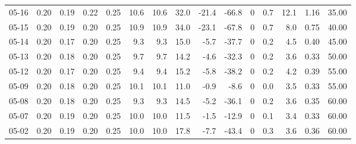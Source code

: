 \begin{threeparttable}
{\begin{tabular}{lrrrrrrrrrrrrrr}
  05-16 &          0.20 &          0.19 &          0.22 &        0.25 &                10.6 &               10.6 &                32.0 &      -21.4 &        -66.8 &              0 &                 0.7 &             12.1 &            1.16 &                  35.00 \\
  05-15 &          0.20 &          0.19 &          0.20 &        0.25 &                10.9 &               10.9 &                34.0 &      -23.1 &        -67.8 &              0 &                 0.7 &              8.0 &            0.75 &                  40.00 \\
  05-14 &          0.20 &          0.17 &          0.20 &        0.25 &                 9.3 &                9.3 &                15.0 &       -5.7 &        -37.7 &              0 &                 0.2 &              4.5 &            0.40 &                  45.00 \\
  05-13 &          0.20 &          0.18 &          0.20 &        0.25 &                 9.7 &                9.7 &                14.2 &       -4.6 &        -32.3 &              0 &                 0.2 &              3.6 &            0.33 &                  50.00 \\
  05-12 &          0.20 &          0.17 &          0.20 &        0.25 &                 9.4 &                9.4 &                15.2 &       -5.8 &        -38.2 &              0 &                 0.2 &              4.2 &            0.39 &                  55.00 \\
  05-09 &          0.20 &          0.18 &          0.20 &        0.25 &                10.1 &               10.1 &                11.0 &       -0.9 &         -8.6 &              0 &                 0.0 &              3.5 &            0.33 &                  55.00 \\
  05-08 &          0.20 &          0.18 &          0.20 &        0.25 &                 9.3 &                9.3 &                14.5 &       -5.2 &        -36.1 &              0 &                 0.2 &              3.6 &            0.35 &                  60.00 \\
  05-07 &          0.20 &          0.19 &          0.20 &        0.25 &                10.0 &               10.0 &                11.5 &       -1.5 &        -12.9 &              0 &                 0.1 &              3.4 &            0.33 &                  60.00 \\
  05-02 &          0.20 &          0.19 &          0.20 &        0.25 &                10.0 &               10.0 &                17.8 &       -7.7 &        -43.4 &              0 &                 0.3 &              3.6 &            0.36 &                  60.00 \\

\end{tabular}}
\end{threeparttable}
